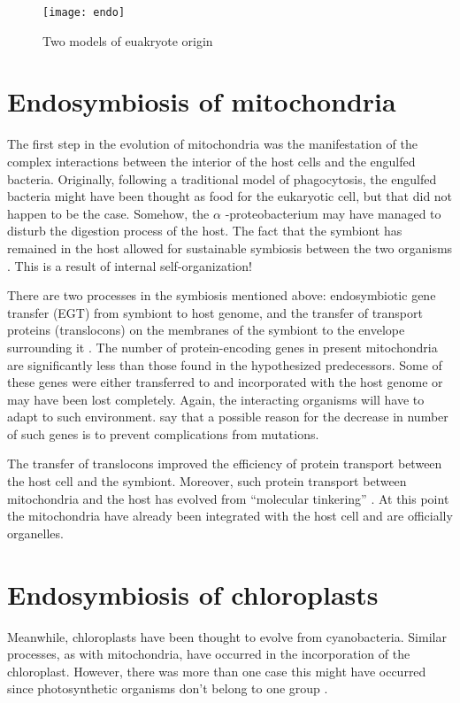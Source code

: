 \begin{figure}
    \centering
    \texttt{[image: endo]}
    \caption{Two models of euakryote origin}
    \label{fig:endo}
\end{figure}

\section{Endosymbiosis of mitochondria}
The first step in the evolution of mitochondria was the manifestation of the complex interactions between the interior of the host cells and the engulfed bacteria.
Originally, following a traditional model of phagocytosis, the engulfed bacteria might have been thought as food for the eukaryotic cell, but that did not happen to be the case.
Somehow, the $\alpha$ -proteobacterium may have managed to disturb the digestion process of the host.
The fact that the symbiont has remained in the host allowed for sustainable symbiosis between the two organisms \cite{endo}.
This is a result of internal self-organization!

There are two processes in the symbiosis mentioned above: endosymbiotic gene transfer (EGT) from symbiont to host genome, and the transfer of transport proteins (translocons) on the membranes of the symbiont to the envelope surrounding it \cite{endo}.
The number of protein-encoding genes in present mitochondria are significantly less than those found in the hypothesized predecessors.
Some of these genes were either transferred to and incorporated with the host genome or may have been lost completely.
Again, the interacting organisms will have to adapt to such environment.
 say that a possible reason for the decrease in number of such genes is to prevent complications from mutations.

The transfer of translocons improved the efficiency of protein transport between the host cell and the symbiont.
Moreover, such protein transport between mitochondria and the host has evolved from ``molecular tinkering'' \cite{endo}.
At this point the mitochondria have already been integrated with the host cell and are officially organelles.

\section{Endosymbiosis of chloroplasts}
Meanwhile, chloroplasts have been thought to evolve from cyanobacteria.
Similar processes, as with mitochondria, have occurred in the incorporation of the chloroplast.
However, there was more than one case this might have occurred since photosynthetic organisms don't belong to one group \cite{biomain}.

